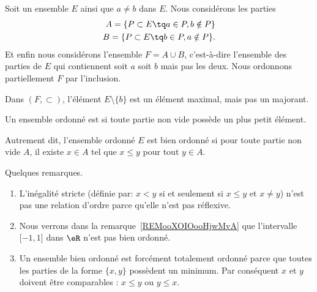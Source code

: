 \begin{example} \label{ExeooMaximalPasMajorant}
	Soit un ensemble \( E\) ainsi que \( a\neq b\) dans \( E\). Nous considérons les parties
	\begin{subequations}
		\begin{align}
			A=\{ P\subset E\tq a\in P,b\notin P \} \\
			B=\{ P\subset E\tq b\in P,a\notin P \}.
		\end{align}
	\end{subequations}
	Et enfin nous considérons l'ensemble \( F=A\cup B\), c'est-à-dire l'ensemble des parties de \( E\) qui contiennent soit \( a\) soit \( b\) mais pas les deux. Nous ordonnons partiellement \( F\) par l'inclusion.

	Dans \( (F,\subset)\), l'élément \( E\setminus\{ b \}\) est un élément maximal, mais pas un majorant.
\end{example}

\begin{definition}   \label{DEFooLJEAooBLGsiS}
	Un ensemble ordonné est  si toute partie non vide possède un plus petit élément.

	Autrement dit, l'ensemble ordonné \( E\) est bien ordonné si pour toute partie non vide \( A\), il existe \( x\in A\) tel que \( x\leq y\) pour tout \( y\in A\).
\end{definition}

\begin{normaltext}  \label{NorooOrdreBienOrdonne}
	Quelques remarques.
	\begin{enumerate}
		\item
		      L'inégalité stricte (définie par: \( x<y\) si et seulement si \( x\leq y\) et \( x\neq y\)) n'est pas une relation d'ordre parce qu'elle n'est pas réflexive.
		\item
		      Nous verrons dans la remarque~\ref{REMooXOIOooHjwMvA}
		      que l'intervalle \( \mathopen[ -1 , 1 \mathclose]\) dans \( \eR\) n'est pas bien ordonné.
		\item
		      Un ensemble bien ordonné est forcément totalement ordonné parce que toutes les parties de la forme \( \{ x,y \}\) possèdent un minimum. Par conséquent \( x\) et \( y\) doivent être comparables : \( x\leq y\) ou \( y\leq x\).
	\end{enumerate}
\end{normaltext}




